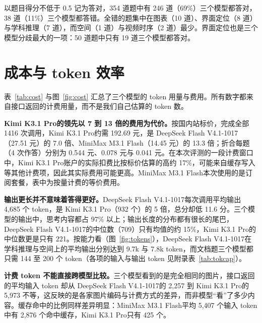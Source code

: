 \documentclass[11pt,a4paper,fontset=none]{ctexart}
\newcommand{\kimi}{Kimi K3.1 Pro}
\newcommand{\mini}{MiniMax M3.1 Flash}
\newcommand{\ds}{DeepSeek Flash V4.1-1017}
\newcommand{\lead}[1]{\textbf{#1}\quad}
\begin{document}
以题目得分不低于 0.5 记为答对，354 道题中有 246 道（69\%）三个模型都答对，38 道（11\%）三个模型都答错。全错的题集中在图表（10 道）、界面定位（8 道）与学科推理（7 道），而空间（1 道）与视频时序（2 道）最少。界面定位也是三个模型分歧最大的一项：50 道题中只有 19 道三个模型都答对。

\section{成本与 token 效率}
\label{sec:cost}

\begin{table}[t]
  \centering
  \caption{\textbf{token 用量与费用（越低越好 $\downarrow$）。}token 数为各厂商接口返回的计费用量，不同厂商对同一张图片的计数方式不同，因此只有费用可以跨模型比较。费用按表~\ref{tab:models} 的国内站标价计算；\ds 的全部调用都在空闲时段（周六），按高峰价约为 55.02 元。美元为各厂商国际站标价，仅供参考。}
  \label{tab:cost}
  \small
  \begin{adjustbox}{max width=\linewidth}\end{adjustbox}
\end{table}

表~\ref{tab:cost} 与图~\ref{fig:cost} 汇总了三个模型的 token 用量与费用。所有数字都来自接口返回的计费用量，而不是我们自己估算的 token 数。

\lead{\kimi 的领先以 7 到 13 倍的费用为代价。}按国内站标价，完成全部 1416 次调用，\kimi 约需 192.69 元，是 \ds（27.51 元）的 7.0 倍、\mini（14.45 元）的 13.3 倍；折合每题（4 次作答）分别为 0.544 元、0.078 元与 0.041 元。在本次评测的一段计费窗口中，\kimi 账户的实际扣费比按标价估算的高约 17\%，可能来自缓存写入等其他计费项，因此其实际费用可能更高。\mini 本次使用的是订阅套餐，表中为按量计费的等价费用。

\lead{输出更长并不意味着答得更好。}\ds 每次调用平均输出 4,685 个 token，是 \kimi（932 个）的 5 倍，总分却低 11.6 分。三个模型的输出中，思考内容都占 97\% 以上；输出长度的分布都有很长的尾巴，\ds 的中位数（709）只有均值的约 15\%，\kimi 的中位数更是只有 221。按能力看（图~\ref{fig:tokens}），\ds 在学科推理与空间上的平均输出分别达到 9.7k 与 7.8k token，而文档题三个模型都只需 144 至 200 个 token（各项的输入与输出 token 见附录表~\ref{tab:tokcap}）。

\lead{计费 token 不能直接跨模型比较。}三个模型看到的是完全相同的图片，接口返回的平均输入 token 却从 \ds 的 2,257 到 \kimi 的 5,973 不等，这反映的是各家图片编码与计费方式的差异，而非模型“看”了多少内容。缓存命中的比例同样差异明显：\mini 平均 5,407 个输入 token 中有 2,876 个命中缓存，\kimi 只有 425 个。
\end{document}
